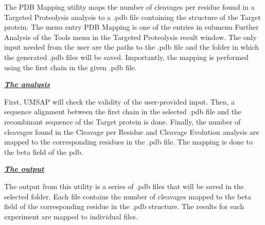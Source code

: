 The PDB Mapping utility maps the number of cleavages per residue found in a Targeted
Proteolysis analysis to a .pdb file containing the structure of the Target protein.
The menu entry PDB Mapping is one of the entries in submenu Further Analysis of the
Tools menu in the Targeted Proteolysis result window. The only input needed from
the user are the paths to the .pdb file and the folder in which the generated .pdb
files will be saved. Importantly, the mapping is performed using the first chain
in the given .pdb file.

\textit{\textbf{\underline{The analysis}}}

First, UMSAP will check the validity of the user-provided input. Then, a sequence
alignment between the first chain in the selected .pdb file and the recombinant 
sequence of the Target protein is done. Finally, the number of cleavages found in
the Cleavage per Residue and Cleavage Evolution analysis are mapped to the
corresponding residues in the .pdb file. The mapping is done to the beta field of
the pdb.

\textit{\textbf{\underline{The output}}}

The output from this utility is a series of .pdb files that will be saved in the
selected folder. Each file contains the number of cleavages mapped to the beta field
of the corresponding residue in the .pdb structure. The results for each experiment
are mapped to individual files.




